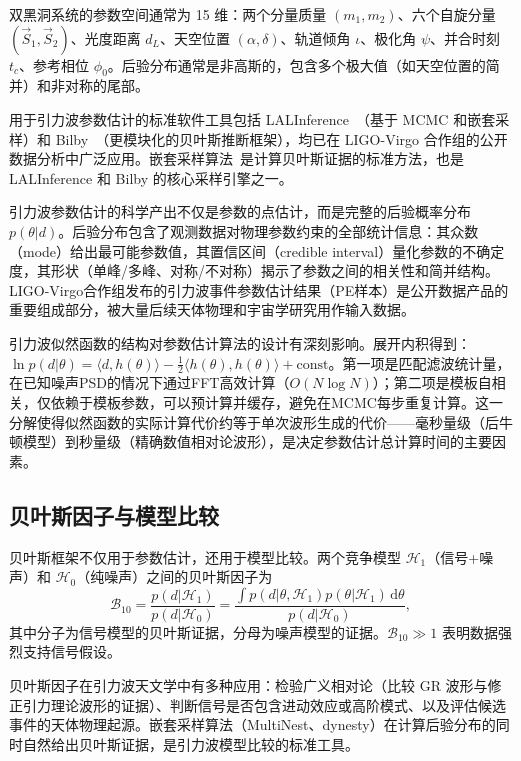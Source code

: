 双黑洞系统的参数空间通常为 15 维：两个分量质量 $(m_1, m_2)$、六个自旋分量 $(\vec{S}_1, \vec{S}_2)$、光度距离 $d_L$、天空位置 $(\alpha, \delta)$、轨道倾角 $\iota$、极化角 $\psi$、并合时刻 $t_c$、参考相位 $\phi_0$。后验分布通常是非高斯的，包含多个极大值（如天空位置的简并）和非对称的尾部。

用于引力波参数估计的标准软件工具包括 LALInference~\cite{Veitch2015LALInference}（基于 MCMC 和嵌套采样）和 Bilby~\cite{Ashton2019Bilby}（更模块化的贝叶斯推断框架），均已在 LIGO-Virgo 合作组的公开数据分析中广泛应用。嵌套采样算法~\cite{Skilling2006nested}是计算贝叶斯证据的标准方法，也是 LALInference 和 Bilby 的核心采样引擎之一。

引力波参数估计的科学产出不仅是参数的点估计，而是完整的后验概率分布 $p(\theta|d)$。后验分布包含了观测数据对物理参数约束的全部统计信息：其众数（mode）给出最可能参数值，其置信区间（credible interval）量化参数的不确定度，其形状（单峰/多峰、对称/不对称）揭示了参数之间的相关性和简并结构。LIGO-Virgo合作组发布的引力波事件参数估计结果（PE样本）是公开数据产品的重要组成部分，被大量后续天体物理和宇宙学研究用作输入数据。

引力波似然函数的结构对参数估计算法的设计有深刻影响。展开内积得到：$\ln p(d|\theta) = \langle d, h(\theta)\rangle - \frac{1}{2}\langle h(\theta), h(\theta)\rangle + \text{const}$。第一项是匹配滤波统计量，在已知噪声PSD的情况下通过FFT高效计算（$O(N\log N)$）；第二项是模板自相关，仅依赖于模板参数，可以预计算并缓存，避免在MCMC每步重复计算。这一分解使得似然函数的实际计算代价约等于单次波形生成的代价——毫秒量级（后牛顿模型）到秒量级（精确数值相对论波形），是决定参数估计总计算时间的主要因素。

\subsection{贝叶斯因子与模型比较}

贝叶斯框架不仅用于参数估计，还用于模型比较。两个竞争模型 $\mathcal{H}_1$（信号+噪声）和 $\mathcal{H}_0$（纯噪声）之间的贝叶斯因子为
\begin{equation}
  \mathcal{B}_{10} = \frac{p(d|\mathcal{H}_1)}{p(d|\mathcal{H}_0)} = \frac{\int p(d|\theta,\mathcal{H}_1)p(\theta|\mathcal{H}_1)\,\mathrm{d}\theta}{p(d|\mathcal{H}_0)},
\end{equation}
其中分子为信号模型的贝叶斯证据，分母为噪声模型的证据。$\mathcal{B}_{10} \gg 1$ 表明数据强烈支持信号假设。

贝叶斯因子在引力波天文学中有多种应用：检验广义相对论（比较 GR 波形与修正引力理论波形的证据）、判断信号是否包含进动效应或高阶模式、以及评估候选事件的天体物理起源。嵌套采样算法（MultiNest、dynesty）在计算后验分布的同时自然给出贝叶斯证据，是引力波模型比较的标准工具。

